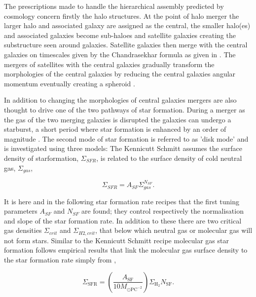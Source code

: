 The prescriptions made to handle the hierarchical assembly predicted by \LCDM cosmology concern firstly the halo structures. At the point of halo merger the larger halo and associated galaxy are assigned as the central, the smaller halo(es) and associated galaxies become sub-haloes and satellite galaxies creating the substructure seen around galaxies. Satellite galaxies then merge with the central galaxies on timescales given by the Chandrasekhar formula \citep{Chandrasekhar1943DYNAMICALFRICTION} as given in \citet{Boylan-Kolchin2008}. The mergers of satellites with the central galaxies gradually transform the morphologies of the central galaxies by reducing the central galaxies angular momentum eventually creating a spheroid \cite{Hopkins2009HOWMERGERS}. 

In addition to changing the morphologies of central galaxies mergers are also thought to drive one of the two pathways of star formation. During a merger as the gas of the two merging galaxies is disrupted the galaxies can undergo a starburst, a short period where star formation is enhanced by an order of magnitude \citep{Hopkins2009HOWMERGERS}. The second mode of star formation is referred to as 'disk mode' and is investigated using three models: The Kennicutt Schmitt \citep{KennicuttJr.1998TheGalaxies} assumes the surface density of starformation, $\Sigma_{SFR}$, is related to the surface density of cold neutral gas, $\Sigma_{gas}$,

\begin{equation}
    \Sigma_{SFR} = A_{SF}\Sigma_{gas}^{N_{SF}}.
\end{equation}

It is here and in the following star formation rate recipes that the first tuning parameters $A_{SF}$ and $N_{SF}$ are found; they control respectively the normalisation and slope of the star formation rate. In addition to these there are two critical gas densities $\Sigma_{crit}$ and $\Sigma_{H2,crit}$, that below which neutral gas or molecular gas will not form stars. Similar to the Kennicutt Schmitt recipe molecular gas star formation follows empirical results that link the molecular gas surface density to the star formation rate simply from \citet{Bigiel2008TheResolution},

\begin{equation}
    \Sigma_{\mathrm{SFR}}=\left(\frac{A_{\mathrm{SF}}}{10 M_{\odot \mathrm{PC}^{-2}}}\right) \Sigma_{\mathrm{H}_{2}} N_{\mathrm{SF}}.
\end{equation}

